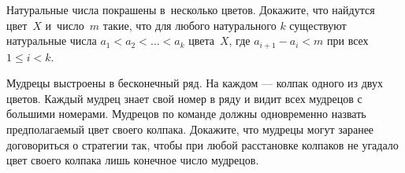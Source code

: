 \begin{problems}



\item Натуральные числа покрашены в~несколько цветов. Докажите, что найдутся цвет~$X$ и~число~$m$ такие, что для любого натурального $k$ существуют натуральные числа $a_{1} < a_{2} < \ldots < a_{k}$ цвета~$X$, где $a_{i+1} - a_{i} < m$ при всех $1 \leq i < k$.

\item Мудрецы выстроены в бесконечный ряд. На каждом --- колпак одного из двух цветов. Каждый мудрец знает свой номер в ряду и видит всех мудрецов с большими номерами. Мудрецов по команде должны одновременно назвать предполагаемый цвет своего колпака. Докажите, что мудрецы могут заранее договориться о стратегии так, чтобы при любой расстановке колпаков не угадало цвет своего колпака лишь конечное число мудрецов.

\end{problems}